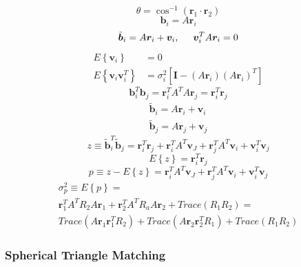 \documentclass[12pt,a4paper,oneside]{article}
\begin{document}
\cite{gottlieb1978star}
\begin{equation}
\theta = \cos^{-1}(\bm{r}_1 \cdot \bm{r}_2)
\end{equation}
\begin{equation}
\bm{b}_i = A\bm{r}_i
\end{equation}
\begin{equation}
\tilde{\bm{b}}_i = A\bm{r}_i + \bm{v}_i, \hspace{0.5cm} \bm{v}_i^TA\bm{r}_i = 0
\end{equation}
\begin{subequations}
\begin{align*}
E\left\{\bm{v}_i\right\} &= 0 \\
E\left\{\bm{v}_i\bm{v}_i^T\right\} &= \sigma_i^2 [\bm{I} - (A\bm{r}_i)(A\bm{r}_i)^T]
\end{align*}
\end{subequations}
\begin{equation}
\bm{b}_i^T\bm{b}_j = \bm{r}_i^TA^TA\bm{r}_j = \bm{r}_i^T\bm{r}_j
\end{equation}
\begin{subequations}
\begin{align*}
\tilde{\bm{b}}_i = A\bm{r}_i + \bm{v}_i\\
\tilde{\bm{b}}_j = A\bm{r}_j + \bm{v}_j
\end{align*}
\end{subequations}
\begin{equation}
z \equiv \tilde{\bm{b}}_i^T\tilde{\bm{b}}_j = \bm{r}_i^T\bm{r}_j + \bm{r}_i^TA^T\bm{v}_J + \bm{r}_j^TA^T\bm{v}_i + \bm{v}_i^T\bm{v}_j
\end{equation}
\begin{equation}
E\left\{z\right\} = \bm{r}_i^T\bm{r}_j
\end{equation}
\begin{equation}
p \equiv z - E\left\{z\right\} = \bm{r}_i^TA^T\bm{v}_J + \bm{r}_j^TA^T\bm{v}_i + \bm{v}_i^T\bm{v}_j
\end{equation}
\begin{equation}
\begin{split}
\sigma_p^2 \equiv E\left\{p\right\} = \\
\bm{r}_1^TA^TR_2A\bm{r}_1 + \bm{r}_2^TA^TR_aA\bm{r}_2 + Trace(R_1R_2) = \\
Trace(A\bm{r}_1\bm{r}_1^TR_2) + Trace(A\bm{r}_2\bm{r}_2^TR_1) + Trace(R_1R_2)
\end{split}
\end{equation}
\subsubsection{Spherical Triangle Matching}
\end{document}
